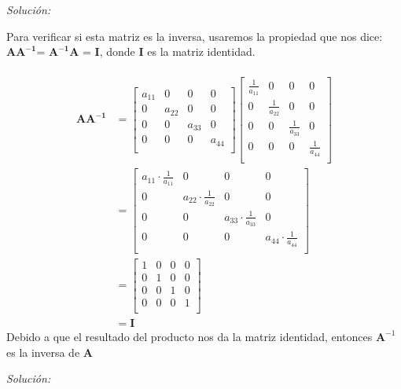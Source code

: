 \documentclass[12pt]{article}
\newenvironment{problem}[2][Problema]{\begin{trivlist}
\item[\hskip \labelsep {\bfseries #1}\hskip \labelsep {\bfseries #2.}]}{\end{trivlist}}
\newenvironment{sol}
    {\emph{Solución:}
    }
    {
    }
\begin{document}
\begin{sol}
Para verificar si esta matriz es la inversa, usaremos la propiedad que nos dice:
$\mathbf{AA^{-1}}$= $\mathbf{A^{-1}A}$ = \textbf{I}, donde \textbf{I} es la matriz identidad.\\ \\
\begin{align*}
\mathbf{AA^{-1}} &=
\begin{bmatrix}
a_{11} & 0 & 0 & 0 \\
0 & a_{22} & 0 & 0 \\
0 & 0 & a_{33} & 0 \\
0 & 0 & 0 & a_{44} \\
\end{bmatrix}
\begin{bmatrix}
\frac{1}{a_{11}} & 0 & 0 & 0 \\
0 & \frac{1}{a_{22}} & 0 & 0 \\
0 & 0 & \frac{1}{a_{33}} & 0 \\
0 & 0 & 0 & \frac{1}{a_{44}} \\
\end{bmatrix} \\
&= 
\begin{bmatrix}
a_{11} \cdot \frac{1}{a_{11}} & 0 & 0 & 0 \\
0 & a_{22} \cdot\frac{1}{a_{22}} & 0 & 0 \\
0 & 0 & a_{33} \cdot\frac{1}{a_{33}} & 0 \\
0 & 0 & 0 & a_{44} \cdot\frac{1}{a_{44}} \\
\end{bmatrix}\\
&=
\begin{bmatrix}
1 & 0 & 0 & 0 \\
0 & 1 & 0 & 0 \\
0 & 0 & 1 & 0 \\
0 & 0 & 0 & 1 \\
\end{bmatrix} \\
&= \mathbf{I}
\end{align*}
Debido a que el resultado del producto nos da la matriz identidad, entonces $\mathbf{A}^{-1}$ es la inversa de \textbf{A} 
\end{sol}

\pagebreak

\begin{problem}{5}

\end{problem}
\begin{sol}

\end{sol}






\end{document}
